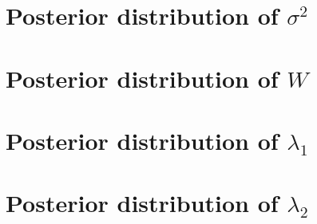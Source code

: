 \documentclass[10pt]{article} %
\begin{document}
\newpage
\section{Posterior distribution of $\sigma^2$}
\begin{figure}[H]
  \begin{center}  %
  \end{center}
  \label{fig:sig}
\end{figure}

\newpage
\section{Posterior distribution of $W$}
\begin{figure}[H]
  \begin{center}  %
  \end{center}
  \label{fig:w}
\end{figure}


\newpage
\section{Posterior distribution of $\lambda_1$}
\begin{figure}[H]
  \begin{center}  %
  \end{center}
  \label{fig:lam1}
\end{figure}

\newpage
\section{Posterior distribution of $\lambda_2$}
\begin{figure}[H]
  \begin{center}  %
  \end{center}
  \label{fig:lam2}
\end{figure}
\end{document}
